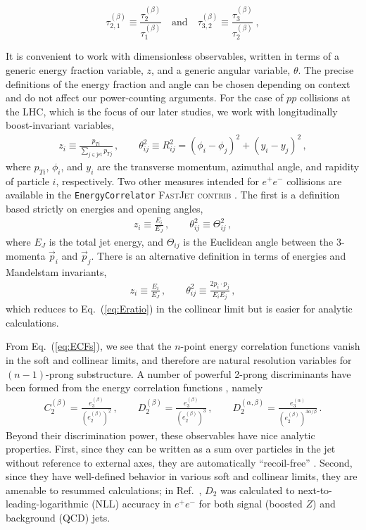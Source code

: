 \documentclass[11pt,letterpaper]{article}
\DeclareRobustCommand{\Eq}[1]{Eq.~(\ref{#1})}
\DeclareRobustCommand{\Ref}[1]{Ref.~\cite{#1}}
\newcommand{\ecf}[2]{e_{#1}^{(#2)}}
\newcommand{\Dobs}[2]{D_{#1}^{(#2)}}
\newcommand{\Dobsnobeta}[1]{D_{#1}}
\newcommand{\Cobs}[2]{C_{#1}^{(#2)}}
\newcommand{\Nsub}[2]{\tau_{#1}^{(#2)}}
\newcommand{\fastjet}[1]{\textsc{FastJet\xspace #1}}
\begin{document}
$$
\Nsub{2,1}{\beta}\equiv \frac{\Nsub{2}{\beta}}{\Nsub{1}{\beta}} \quad\text{and}\quad \Nsub{3,2}{\beta}\equiv \frac{\Nsub{3}{\beta}}{\Nsub{2}{\beta}} \ ,
$$


It is convenient to work with dimensionless observables, written in terms of a generic energy fraction variable, $z$, and a generic angular variable, $\theta$. The precise definitions of the energy fraction and angle can be chosen depending on context and do not affect our power-counting arguments. For the case of $pp$ collisions at the LHC, which is the focus of our later studies, we work with longitudinally boost-invariant variables,
\begin{align}\label{eq:ptratio}  
z_i\equiv\frac{p_{Ti}}{\sum_{j \in \text{jet}} p_{Tj}}\,, \qquad  \theta_{ij}^2\equiv R_{ij}^2 = (\phi_i-\phi_j)^2+(y_i-y_j)^2\,,
\end{align}
where $p_{Ti}$, $\phi_i$, and $y_i$ are the transverse momentum, azimuthal angle, and rapidity of particle $i$, respectively. 
Two other measures intended for $e^+e^-$ collisions are available in the \texttt{EnergyCorrelator} \fastjet{contrib} \cite{Cacciari:2011ma,fjcontrib}.  The first is a definition based strictly on energies and opening angles,
\begin{align}\label{eq:Eratio}
z_i\equiv\frac{E_{i}}{E_{J}}\,,  \qquad \theta_{ij}^2\equiv \Theta_{ij}^2 \,,
\end{align}
where $E_J$ is the total jet energy, and $\Theta_{ij}$ is the Euclidean angle between the 3-momenta $\vec p_i$ and $\vec p_j$.  There is an alternative definition in terms of energies and Mandelstam invariants,
\begin{align}\label{eq:mandelstamratio}
z_i\equiv\frac{E_{i}}{E_{J}}\,,  \qquad \theta_{ij}^2\equiv\frac{2p_i \cdot p_j}{E_i E_j}  \,,
\end{align}
which reduces to \Eq{eq:Eratio} in the collinear limit but is easier for analytic calculations.

From \Eq{eq:ECFs}, we see that the $n$-point energy correlation functions vanish in the soft and collinear limits, and therefore are natural resolution variables for $(n-1)$-prong substructure.  A number of powerful 2-prong discriminants have been formed from the energy correlation functions  \cite{Larkoski:2013eya,Larkoski:2014gra}, namely
\begin{align}
\Cobs{2}{\beta}=\frac{\ecf{3}{\beta}}{(\ecf{2}{\beta})^{2}}\,,\qquad \Dobs{2}{\beta}=\frac{\ecf{3}{\beta}}{(\ecf{2}{\beta})^{3}}\,, \qquad \Dobs{2}{\alpha,\beta}=\frac{\ecf{3}{\alpha}}{(\ecf{2}{\beta})^{3\alpha/\beta}}\,.
\end{align}
Beyond their discrimination power, these observables have nice analytic properties.  First, since they can be written as a sum over particles in the jet without reference to external axes, they are automatically ``recoil-free'' \cite{Catani:1992jc,Dokshitzer:1998kz,Banfi:2004yd,Larkoski:2013eya,Larkoski:2014uqa}. Second, since they have well-defined behavior in various soft and collinear limits, they are amenable to resummed calculations;  in \Ref{Larkoski:2015kga}, $\Dobsnobeta{2}$ was calculated to next-to-leading-logarithmic (NLL) accuracy in $e^+e^-$ for both signal (boosted $Z$) and background (QCD) jets. 
\end{document}
